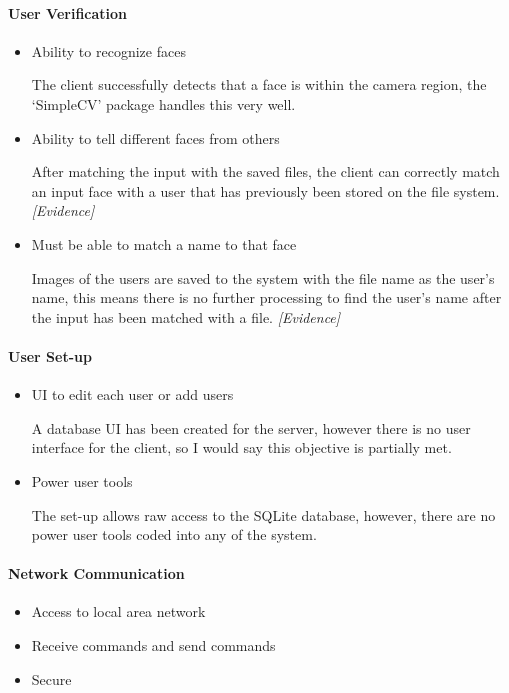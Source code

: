 \documentclass[a4paper]{article}
\begin{document}
		\paragraph{User Verification}
			\begin{itemize}
				\item Ability to recognize faces

				The client successfully detects that a face is within the camera region, the `SimpleCV' package
				handles this very well.

				\item Ability to tell different faces from others
				
				After matching the input with the saved files, the client can correctly match an input face with a
				user that has previously been stored on the file system. \textit{[Evidence]}

				\item Must be able to match a name to that face

				Images of the users are saved to the system with the file name as the user's name, this means there is
				no further processing to find the user's name after the input has been matched with a file. \textit{[Evidence]}
			\end{itemize}

		\paragraph{User Set-up}

			\begin{itemize}
				\item UI to edit each user or add users

				A database UI has been created for the server, however there is no user interface for the client, so I would
				say this objective is partially met.
				
				\item Power user tools

				The set-up allows raw access to the SQLite database, however, there are no power user tools coded into any of
				the system.
			\end{itemize}

		\paragraph{Network Communication}
		
			\begin{itemize}
				\item Access to local area network
				\item Receive commands and send commands
				\item Secure
			\end{itemize}
\end{document}
